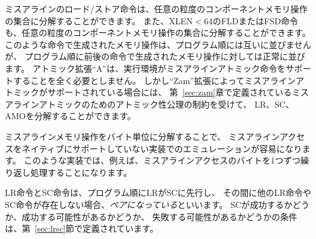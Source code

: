 \begin{comment}
A misaligned load or store instruction may be decomposed into a set of component memory operations of any granularity.
An FLD or FSD instruction for which XLEN$<$64 may also be decomposed into a set of component memory operations of any granularity.
The memory operations generated by such instructions are not ordered with respect to each other in program order, but they are ordered normally with respect to the memory operations generated by preceding and subsequent instructions in program order.
The atomics extension ``A'' does not require execution environments to support misaligned atomic instructions at all; however, if misaligned atomics are supported via the ``Zam'' extension, LRs, SCs, and AMOs may be decomposed subject to the constraints of the atomicity axiom for misaligned atomics, which is defined in Chapter~\ref{sec:zam}.
\end{comment}

ミスアラインのロード/ストア命令は、任意の粒度のコンポーネントメモリ操作の集合に分解することができます。
また、XLEN$<$64のFLDまたはFSD命令も、任意の粒度のコンポーネントメモリ操作の集合に分解することができます。
このような命令で生成されたメモリ操作は、プログラム順には互いに並びませんが、
プログラム順に前後の命令で生成されたメモリ操作に対しては正常に並びます。
アトミック拡張``A''は、実行環境がミスアラインアトミック命令をサポートすることを全く必要としません。
しかし``Zam''拡張によってミスアラインアトミックがサポートされている場合には、
第~\ref{sec:zam}章で定義されているミスアラインアトミックのためのアトミック性公理の制約を受けて、
LR、SC、AMOを分解することができます。

\begin{commentary}
\begin{comment}
  The decomposition of misaligned memory operations down to byte granularity facilitates emulation on implementations that do not natively support misaligned accesses.
  Such implementations might, for example, simply iterate over the bytes of a misaligned access one by one.
\end{comment}
  ミスアラインメモリ操作をバイト単位に分解することで、
ミスアラインアクセスをネイティブにサポートしていない実装でのエミュレーションが容易になります。
  このような実装では、例えば、ミスアラインアクセスのバイトを1つずつ繰り返し処理することになります。
\end{commentary}

\begin{comment}
An LR instruction and an SC instruction are said to be {\em paired} if the LR precedes the SC in program order and if there are no other LR or SC instructions in between; the corresponding memory operations are said to be paired as well (except in case of a failed SC, where no store operation is generated).
The complete list of conditions determining whether an SC must succeed, may succeed, or must fail is defined in Section~\ref{sec:lrsc}.
\end{comment}
LR命令とSC命令は、プログラム順にLRがSCに先行し、
その間に他のLR命令やSC命令が存在しない場合、{\em ペアになっている}といいます。
SCが成功するかどうか、成功する可能性があるかどうか、
失敗する可能性があるかどうかの条件は、第~\ref{sec:lrsc}節で定義されています。

